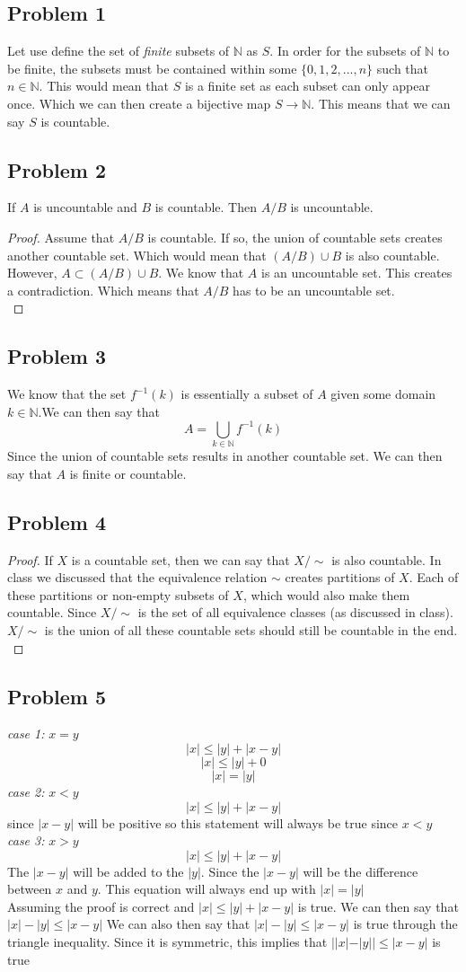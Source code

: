 \documentclass[12pt]{article}
\newcommand{\N}{\mathbb{N}}
\begin{document}
\subsection*{Problem 1}
Let use define the set of \textit{finite} subsets of $\N$ as $S$. In order for the subsets of $\N$ to be finite, the subsets must be contained within some $\{ 0,1,2,..., n \}$ such that $n \in \N$. This would mean that $S$ is a finite set as each subset can only appear once. Which we can then create a bijective map $S \rightarrow \N$. This means that we can say $S$ is countable.
\subsection*{Problem 2}
If $A$ is uncountable and $B$ is countable. Then $A/B$ is uncountable.
\begin{proof}
Assume that $A/B$ is countable. If so, the union of countable sets creates another countable set. Which would mean that $(A/B) \cup B$ is also countable. However, $A \subset (A/B) \cup B$. We know that $A$ is an uncountable set. This creates a contradiction. Which means that $A/B$ has to be an uncountable set. \\
\end{proof}
\subsection*{Problem 3}
We know that the set $f^{-1}(k)$ is essentially a subset of $A$ given some domain $k \in \N$.We can then say that 
\[A = \bigcup_{k \in \N}f^{-1}(k)\]
Since the union of countable sets results in another countable set. We can then say that $A$ is finite or countable.
\subsection*{Problem 4}
\begin{proof}
If $X$ is a countable set, then we can say that $X/ \sim$ is also countable. In class we discussed that the equivalence relation $\sim$ creates partitions of $X$. Each of these partitions or non-empty subsets of $X$, which would also make them countable. Since $X/ \sim$ is the set of all equivalence classes (as discussed in class). $X/ \sim $ is the union of all these countable sets should still be countable in the end. \\
\end{proof}
\subsection*{Problem 5}
\textit{case 1:} $x = y$
\[ |x| \leq |y| + |x - y| \]
\[ |x| \leq |y| + 0 \]
\[ |x| = |y| \]
\textit{case 2:} $x < y$
\[ |x| \leq |y| + |x - y| \]
since $|x-y|$ will be positive so this statement will always be true since $x < y$ \\
\textit{case 3:} $x > y$
\[ |x| \leq |y| + |x - y| \]
The $|x - y|$ will be added to the $|y|$. Since the $|x-y|$ will be the difference between $x$ and $y$. This equation will always end up with $|x| = |y|$ \\

Assuming the proof is correct and $|x| \leq |y| + |x - y|$ is true. We can then say that $|x| - |y| \leq |x - y|$ We can also then say that $|x| - |y| \leq |x - y|$ is true through the triangle inequality. Since it is symmetric, this implies that $||x| - |y|| \leq |x - y|$ is true
\end{document}
